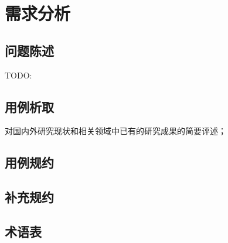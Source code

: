 \chapter{需求分析}
\label{cha:demand_analysis}
\section{问题陈述}


TODO:

\section{用例析取}

对国内外研究现状和相关领域中已有的研究成果的简要评述；
\section{用例规约}

\section{补充规约}

\section{术语表}



